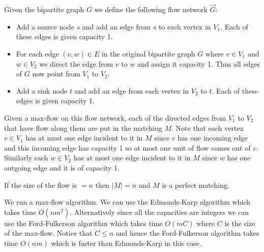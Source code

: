 \documentclass{article}
\begin{document}
Given the bipartite graph $G$ we define the following flow network $\overrightarrow{G}$:
\begin{itemize}
\item
Add a source node $s$ and add an edge from $s$ to each vertex in $V_1$.
Each of these edges is given capacity 1.
\item
For each edge $(v,w)\in E$ in the original bipartite graph $G$ where $v\in V_1$ and $w\in V_2$
we direct the edge from $v$ to $w$ and assign it capacity 1.  Thus all edges of $G$ now
point from $V_1$ to $V_2$.
\item
Add a sink node $t$ and add an edge from each vertex in $V_2$ to $t$.
Each of these edges is given capacity 1.
\end{itemize}

Given a max-flow on this flow network, each of the directed edges from $V_1$ to $V_2$ that
have flow along them are put in the matching $M$.  Note that each vertex $v\in V_1$ has
at most one edge incident to it in $M$ since $v$ has one incoming edge and this incoming edge
has capacity 1 so at most one unit of flow comes out of $v$.  Similarly each $w\in V_2$
has at most one edge incident to it in $M$ since $w$ has one outgoing edge and it is
of capacity 1.

If the size of the flow is $=n$ then $|M|=n$ and $M$ is a perfect matching.

We run a max-flow algorithm.  We can use the Edmonds-Karp algorithm which takes
time $O(nm^2)$.  Alternatively since all the capacities are integers
 we can use the Ford-Fulkerson algorithm which
takes time $O(mC)$ where $C$ is the size of the max-flow.  Notice that $C\leq n$ and
hence the Ford-Fulkerson algorithm takes time $O(nm)$ which is faster than
Edmonds-Karp in this case.
\end{document}
